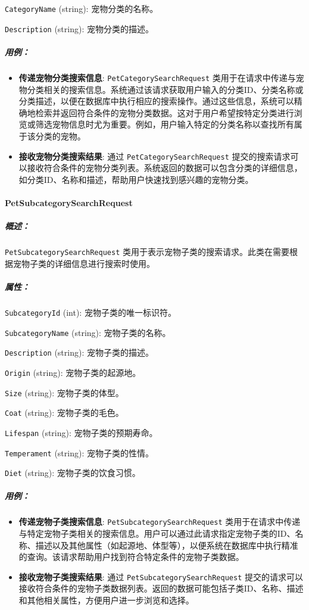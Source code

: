 \texttt{CategoryName} (string): 宠物分类的名称。

\texttt{Description} (string): 宠物分类的描述。


\subparagraph{用例：}
\begin{itemize}
	\item \textbf{传递宠物分类搜索信息}: \texttt{PetCategorySearchRequest} 类用于在请求中传递与宠物分类相关的搜索信息。系统通过该请求获取用户输入的分类ID、分类名称或分类描述，以便在数据库中执行相应的搜索操作。通过这些信息，系统可以精确地检索并返回符合条件的宠物分类数据。这对于用户希望按特定分类进行浏览或筛选宠物信息时尤为重要。例如，用户输入特定的分类名称以查找所有属于该分类的宠物。
	\item \textbf{接收宠物分类搜索结果}: 通过 \texttt{PetCategorySearchRequest} 提交的搜索请求可以接收符合条件的宠物分类列表。系统返回的数据可以包含分类的详细信息，如分类ID、名称和描述，帮助用户快速找到感兴趣的宠物分类。
\end{itemize}

\paragraph{PetSubcategorySearchRequest}
\subparagraph{概述：} \texttt{PetSubcategorySearchRequest} 类用于表示宠物子类的搜索请求。此类在需要根据宠物子类的详细信息进行搜索时使用。

\subparagraph{属性：}

\texttt{SubcategoryId} (int): 宠物子类的唯一标识符。

\texttt{SubcategoryName} (string): 宠物子类的名称。

\texttt{Description} (string): 宠物子类的描述。

\texttt{Origin} (string): 宠物子类的起源地。

\texttt{Size} (string): 宠物子类的体型。

\texttt{Coat} (string): 宠物子类的毛色。

\texttt{Lifespan} (string): 宠物子类的预期寿命。

\texttt{Temperament} (string): 宠物子类的性情。

\texttt{Diet} (string): 宠物子类的饮食习惯。


\subparagraph{用例：}
\begin{itemize}
	\item \textbf{传递宠物子类搜索信息}: \texttt{PetSubcategorySearchRequest} 类用于在请求中传递与特定宠物子类相关的搜索信息。用户可以通过此请求指定宠物子类的ID、名称、描述以及其他属性（如起源地、体型等），以便系统在数据库中执行精准的查询。该请求帮助用户找到符合特定条件的宠物子类数据。
	\item \textbf{接收宠物子类搜索结果}: 通过 \texttt{PetSubcategorySearchRequest} 提交的请求可以接收符合条件的宠物子类数据列表。返回的数据可能包括子类ID、名称、描述和其他相关属性，方便用户进一步浏览和选择。
\end{itemize}


